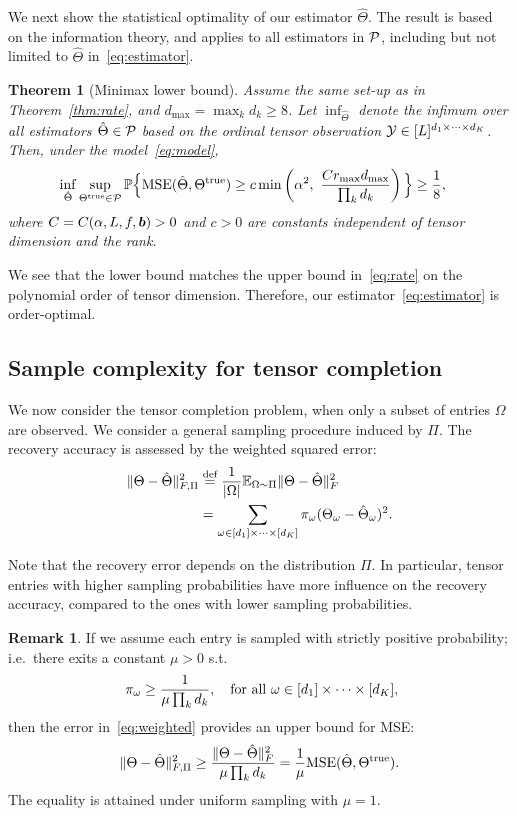 \documentclass[11pt]{article}
\theoremstyle{plain}
\newtheorem{thm}{Theorem}[section]
\theoremstyle{definition}
\newtheorem{rmk}{Remark}
\begin{document}
We next show the statistical optimality of our estimator $\hat \Theta$. The result is based on the information theory, and applies to all estimators in $\mathcal{P}$, including but not limited to $\hat \Theta$ in~\eqref{eq:estimator}.


\begin{thm}[Minimax lower bound]\label{thm:minimax}
Assume the same set-up as in Theorem~\ref{thm:rate}, and $d_{\max}=\max_k d_k \geq 8$. Let $\inf_{\hat \Theta}$ denote the infimum over all estimators $\hat \Theta\in\mathcal{P}$ based on the ordinal tensor observation $\mathcal{Y}\in[L]^{d_1\times \cdots \times d_K}$. Then, under the model~\eqref{eq:model},
\begin{align}\label{eq:lower}
\inf_{\hat \Theta }\sup_{\Theta^{\mathrm{true}}\in\mathcal{P}} \mathbb{P}\Big\{& \text{MSE}(\hat \Theta, \Theta^{\mathrm{true}})  \geq c \min\left( \alpha^2, \ { Cr_{\max}d_{\max} \over \prod_k d_k} \right) \Big\} \geq {1\over 8},
\end{align}
where $C=C(\alpha, L, f,\bm{b})>0$ and $c>0$ are constants independent of tensor dimension and the rank.
\end{thm}
We see that the lower bound matches the upper bound in~\eqref{eq:rate} on the polynomial order of tensor dimension. Therefore, our estimator~\eqref{eq:estimator} is order-optimal.

\subsection{Sample complexity for tensor completion}
We now consider the tensor completion problem, when only a subset of entries $\Omega$ are observed. We consider a general sampling procedure induced by $\Pi$. The recovery accuracy is assessed by the weighted squared error:
\begin{align}\label{eq:weighted}
\lVert\Theta-\hat \Theta\rVert_{F,\Pi}^2&\stackrel{\text{def}}{=}
{1\over |\Omega|}\mathbb{E}_{\Omega\sim \Pi}\lVert\Theta-\hat \Theta\rVert_F^2\notag \\
&=\sum_{\omega\in[d_1]\times \cdots \times [d_K]} \pi_{\omega}(\Theta_{\omega}-\hat \Theta_{\omega})^2.
\end{align}

Note that the recovery error depends on the distribution $\Pi$. In particular, tensor entries with higher sampling probabilities have more influence on the recovery accuracy, compared to the ones with lower sampling probabilities.

\begin{rmk} If we assume each entry is sampled with strictly positive probability; i.e.\ there exits a constant $\mu> 0$ s.t.
\[
\ \pi_\omega\geq {1\over \mu \prod_k d_k},\quad \text{for all}\ \omega\in[d_1]\times\cdots \times [d_K],
\]
then the error in~\eqref{eq:weighted} provides an upper bound for MSE:
\[
\lVert\Theta-\hat \Theta\rVert_{F,\Pi}^2 \geq {\lVert\Theta-\hat \Theta\rVert_F^2\over \mu \prod_kd_k}={1\over \mu}\text{MSE}(\hat \Theta, \Theta^{\mathrm{true}}).
\]
The equality is attained under uniform sampling with $\mu=1$.
\end{rmk}
\end{document}
